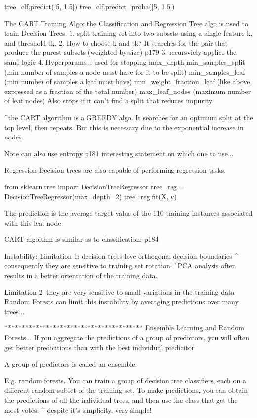 tree_clf.predict([5, 1.5]) 
tree_clf.predict_proba([5, 1.5])

The CART Training Algo:
the Classification and Regression Tree algo is used to train Decision Trees.
1. split training set into two subsets using a single feature k, and threshold tk.
2. How to choose k and tk?
It searches for the pair that produce the purest subsets (weighted by size)
p179
3. recursviely applies the same logic
4. Hyperparams::: used for stopping
max_depth
min_samples_split (min number of samples a node must have for it to be split)
min_samples_leaf (min number of samples a leaf must have)
min_weight_fraction_leaf (like above, expressed as a fraction of the total number)
max_leaf_nodes (maximum number of leaf nodes)
Also stops if it can't find a split that reduces impurity

^the CART algorithm is a GREEDY algo.
It searches for an optimum split at the top level, then repeats.
But this is necessary due to the exponential increase in nodes

Note can also use entropy p181
interesting statement on which one to use...

Regression
Decision trees are also capable of performing regression tasks.

from sklearn.tree import DecisionTreeRegressor
tree_reg = DecisionTreeRegressor(max_depth=2)
tree_reg.fit(X, y)

The prediction is the average target value of the
110 training instances associated with this leaf node

CART algoithm is similar as to classification: p184

Instability:
Limitation 1: decision trees love orthogonal decision boundaries
^ consequently they are sensitive to training set rotation!
^^ PCA analysis often results in a better orientation of the training data.

Limitation 2: they are very sensitive to small variations in the training data
Random Forests can limit this instability by averaging predictions over many trees...





****************************************
Ensemble Learning and Random Forests...
If you aggregate the predictions of a group of predictors,
you will often get better predicitions than with the best individual predicitor

A group of predictors is called an ensemble.

E.g. random forests.
You can train a group of decision tree classifiers,
each on a different random subset of the training set.
To make predictions, you can obtain the predictions of all the individual trees,
and then use the class that get the most votes.
^ despite it's simplicity, very simple!

